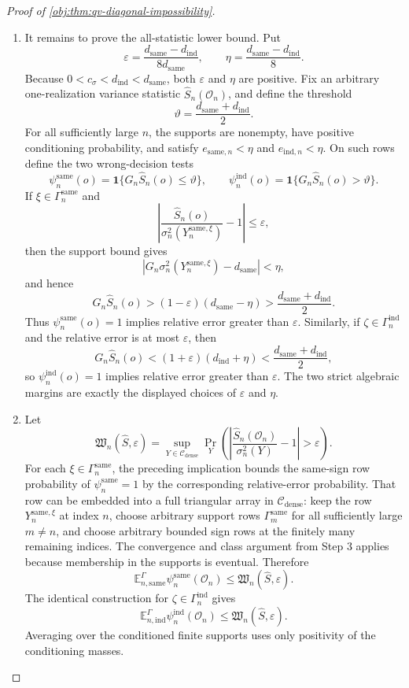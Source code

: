\begin{proof}[Proof of \cref{obj:thm:qv-diagonal-impossibility}]
\begin{enumerate}
\item It remains to prove the all-statistic lower bound. Put
\[
\varepsilon=\frac{d_{\mathrm{same}}-d_{\mathrm{ind}}}{8d_{\mathrm{same}}},
\qquad
\eta=\frac{d_{\mathrm{same}}-d_{\mathrm{ind}}}{8}.
\]
Because \(0<c_\sigma<d_{\mathrm{ind}}<d_{\mathrm{same}}\), both \(\varepsilon\) and \(\eta\) are positive. Fix an arbitrary one-realization variance statistic \(\widehat S_n(\mathcal O_n)\), and define the threshold
\[
\vartheta=\frac{d_{\mathrm{same}}+d_{\mathrm{ind}}}{2}.
\]
For all sufficiently large \(n\), the supports are nonempty, have positive conditioning probability, and satisfy \(e_{\mathrm{same},n}<\eta\) and \(e_{\mathrm{ind},n}<\eta\). On such rows define the two wrong-decision tests
\[
\psi_n^{\mathrm{same}}(o)=\mathbf 1\{G_n\widehat S_n(o)\le\vartheta\},
\qquad
\psi_n^{\mathrm{ind}}(o)=\mathbf 1\{G_n\widehat S_n(o)>\vartheta\}.
\]
If \(\xi\in\Gamma_n^{\mathrm{same}}\) and
\[
\left|
\frac{\widehat S_n(o)}{\sigma_n^2(Y_n^{\mathrm{same},\xi})}-1
\right|\le\varepsilon,
\]
then the support bound gives
\[
|G_n\sigma_n^2(Y_n^{\mathrm{same},\xi})-d_{\mathrm{same}}|<\eta,
\]
and hence
\[
G_n\widehat S_n(o)
>
(1-\varepsilon)(d_{\mathrm{same}}-\eta)
>
\frac{d_{\mathrm{same}}+d_{\mathrm{ind}}}{2}.
\]
Thus \(\psi_n^{\mathrm{same}}(o)=1\) implies relative error greater than \(\varepsilon\). Similarly, if \(\zeta\in\Gamma_n^{\mathrm{ind}}\) and the relative error is at most \(\varepsilon\), then
\[
G_n\widehat S_n(o)
<
(1+\varepsilon)(d_{\mathrm{ind}}+\eta)
<
\frac{d_{\mathrm{same}}+d_{\mathrm{ind}}}{2},
\]
so \(\psi_n^{\mathrm{ind}}(o)=1\) implies relative error greater than \(\varepsilon\). The two strict algebraic margins are exactly the displayed choices of \(\varepsilon\) and \(\eta\). %

\item Let
\[
\mathfrak W_n(\widehat S,\varepsilon)
=
\sup_{Y\in\mathcal C_{\mathrm{dense}}}
\Pr_Y\!\left(
\left|
\frac{\widehat S_n(\mathcal O_n)}{\sigma_n^2(Y)}-1
\right|>\varepsilon
\right).
\]
For each \(\xi\in\Gamma_n^{\mathrm{same}}\), the preceding implication bounds the same-sign row probability of \(\psi_n^{\mathrm{same}}=1\) by the corresponding relative-error probability. That row can be embedded into a full triangular array in \(\mathcal C_{\mathrm{dense}}\): keep the row \(Y_n^{\mathrm{same},\xi}\) at index \(n\), choose arbitrary support rows \(\Gamma_m^{\mathrm{same}}\) for all sufficiently large \(m\ne n\), and choose arbitrary bounded sign rows at the finitely many remaining indices. The convergence and class argument from Step 3 applies because membership in the supports is eventual. Therefore
\[
\mathbb E_{n,\mathrm{same}}^{\Gamma}\psi_n^{\mathrm{same}}(\mathcal O_n)
\le
\mathfrak W_n(\widehat S,\varepsilon).
\]
The identical construction for \(\zeta\in\Gamma_n^{\mathrm{ind}}\) gives
\[
\mathbb E_{n,\mathrm{ind}}^{\Gamma}\psi_n^{\mathrm{ind}}(\mathcal O_n)
\le
\mathfrak W_n(\widehat S,\varepsilon).
\]
Averaging over the conditioned finite supports uses only positivity of the conditioning masses. %


\end{enumerate}
\end{proof}
